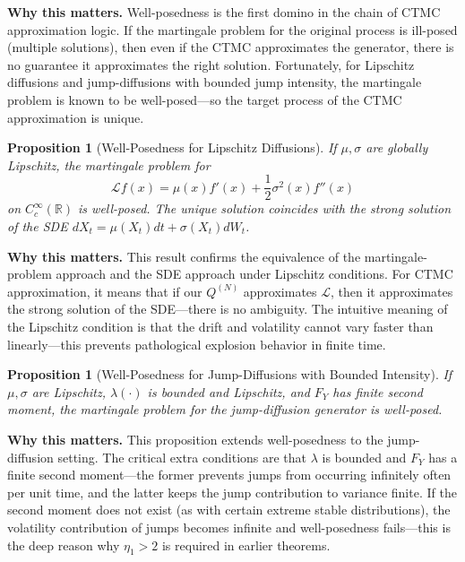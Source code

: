 \documentclass[11pt,a4paper,openany]{book}
\theoremstyle{definition}
\theoremstyle{plain}
\newtheorem{proposition}[theorem]{Proposition}
\theoremstyle{remark}
\newcommand{\1}{\mathbbm{1}}
\newcommand{\R}{\mathbb{R}}
\newcommand{\calL}{\mathcal{L}}
\begin{document}
\medskip
\noindent\textbf{Why this matters.} Well-posedness is the first domino in the chain of CTMC approximation logic. If the martingale problem for the original process is ill-posed (multiple solutions), then even if the CTMC approximates the generator, there is no guarantee it approximates the right solution. Fortunately, for Lipschitz diffusions and jump-diffusions with bounded jump intensity, the martingale problem is known to be well-posed---so the target process of the CTMC approximation is unique.

\begin{proposition}[Well-Posedness for Lipschitz Diffusions]
If $\mu, \sigma$ are globally Lipschitz, the martingale problem for
\[
\calL f(x) = \mu(x) f'(x) + \frac{1}{2} \sigma^{2}(x) f''(x)
\]
on $C_{c}^{\infty}(\R)$ is well-posed. The unique solution coincides with the strong solution of the SDE $dX_{t} = \mu(X_{t}) dt + \sigma(X_{t}) dW_{t}$.
\end{proposition}

\medskip
\noindent\textbf{Why this matters.} This result confirms the equivalence of the martingale-problem approach and the SDE approach under Lipschitz conditions. For CTMC approximation, it means that if our $Q^{(N)}$ approximates $\mathcal{L}$, then it approximates the strong solution of the SDE---there is no ambiguity. The intuitive meaning of the Lipschitz condition is that the drift and volatility cannot vary faster than linearly---this prevents pathological explosion behavior in finite time.

\begin{proposition}[Well-Posedness for Jump-Diffusions with Bounded Intensity]
If $\mu, \sigma$ are Lipschitz, $\lambda(\cdot)$ is bounded and Lipschitz, and $F_{Y}$ has finite second moment, the martingale problem for the jump-diffusion generator is well-posed.
\end{proposition}

\medskip
\noindent\textbf{Why this matters.} This proposition extends well-posedness to the jump-diffusion setting. The critical extra conditions are that $\lambda$ is bounded and $F_Y$ has a finite second moment---the former prevents jumps from occurring infinitely often per unit time, and the latter keeps the jump contribution to variance finite. If the second moment does not exist (as with certain extreme stable distributions), the volatility contribution of jumps becomes infinite and well-posedness fails---this is the deep reason why $\eta_1 > 2$ is required in earlier theorems.
\end{document}

